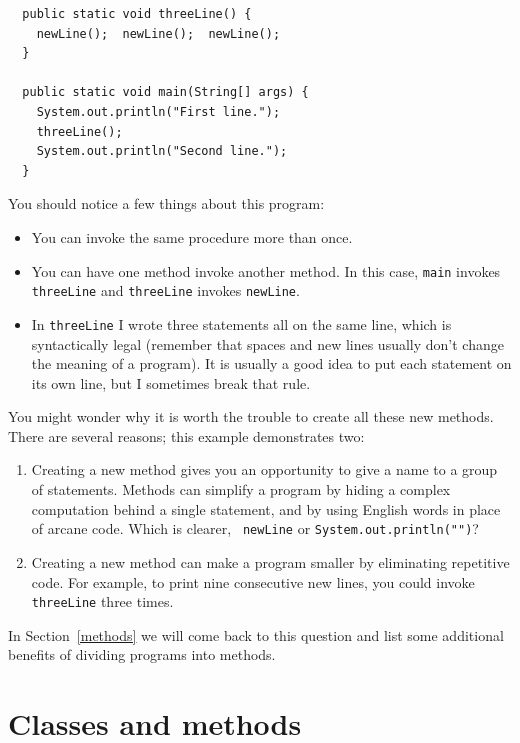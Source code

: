 \documentclass[12pt]{book}
\theoremstyle{exercise}
\begin{document}
\begin{lstlisting}
  public static void threeLine() {
    newLine();  newLine();  newLine();
  }

  public static void main(String[] args) {
    System.out.println("First line.");
    threeLine();
    System.out.println("Second line.");
  }
\end{lstlisting}
%
You should notice a few things about this program:

\begin{itemize}

\item You can invoke the same procedure more than once.

\item You can have one method invoke another method.  In this
case, {\tt main} invokes {\tt threeLine} and {\tt threeLine}
invokes {\tt newLine}.

\item In {\tt threeLine} I wrote three statements all on the same
  line, which is syntactically legal (remember that spaces and new
  lines usually don't change the meaning of a program).  It is usually
  a good idea to put each statement on its own line, but I sometimes
  break that rule.

\end{itemize}

You might wonder why it is worth the trouble to
create all these new methods.  There are several
reasons; this example demonstrates two:

\begin{enumerate}

\item Creating a new method gives you an opportunity to
give a name to a group of statements.  Methods can simplify a program
by hiding a complex computation behind a single statement, and by using
English words in place of arcane code.  Which is clearer, {\tt
newLine} or {\tt System.out.println("")}?

\item Creating a new method can make a program smaller by eliminating
repetitive code.  For example, to print nine consecutive
new lines, you could invoke {\tt threeLine} three times.

\end{enumerate}

In Section~\ref{methods} we will come back to this question and list
some additional benefits of dividing programs into methods.


\section{Classes and methods}
\end{document}
